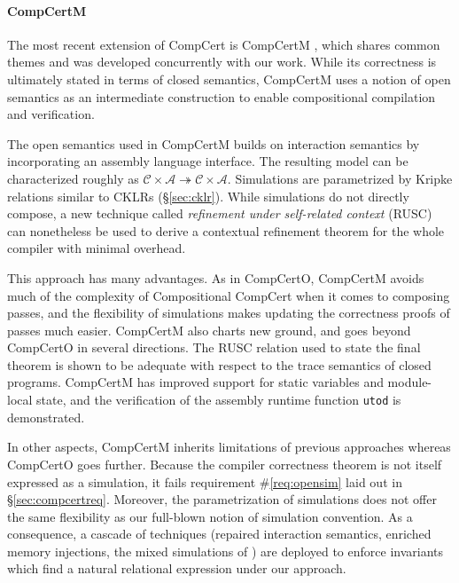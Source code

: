 \documentclass[sigplan,screen]{acmart}
\begin{document}

\paragraph{CompCertM} %

The most recent extension of CompCert is CompCertM \cite{compcertm},
which shares common themes and was developed concurrently
with our work.
While its correctness
is ultimately stated in terms of closed semantics,
CompCertM uses a notion of open semantics
as an intermediate construction
to enable compositional compilation and verification.

The open semantics used in CompCertM
builds on interaction semantics
by incorporating an assembly language interface.
The resulting model can be characterized roughly as
$\mathcal{C} \times \mathcal{A} \twoheadrightarrow
 \mathcal{C} \times \mathcal{A}$.
Simulations
are parametrized by Kripke relations similar to CKLRs (\S\ref{sec:cklr}).
While simulations do not directly compose,
a new technique called \emph{refinement under self-related context}
(RUSC)
can nonetheless be used to derive a contextual refinement theorem
for the whole compiler with minimal overhead.

This approach has many advantages.
As in CompCertO,
CompCertM avoids much of the complexity
of Compositional CompCert
when it comes to composing passes,
and the flexibility of simulations
makes updating the correctness proofs of passes much easier.
CompCertM also charts new ground,
and goes beyond CompCertO
in several directions.
The RUSC relation used to state the final theorem
is shown to be adequate with respect to the trace semantics
of closed programs.
CompCertM has improved support for static variables
and module-local state,
and the verification of
the assembly runtime function \texttt{utod} is demonstrated.

In other aspects, CompCertM inherits limitations of previous
approaches whereas CompCertO goes further.  Because the compiler
correctness theorem is not itself expressed as a simulation, it fails
requirement \#\ref{req:opensim} laid out in \S\ref{sec:compcertreq}.
Moreover, the parametrization of simulations does not offer the same
flexibility as our full-blown notion of simulation convention.  As a
consequence, a cascade of techniques (repaired interaction
semantics, enriched memory injections, the mixed simulations of
\cite{pilsner}) are deployed to enforce invariants which find a
natural relational expression under our approach.
\end{document}
